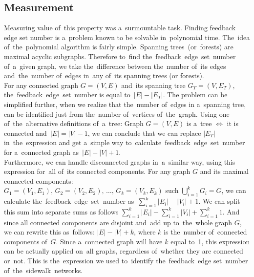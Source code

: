 \subsection{Measurement}
Measuring value of~this property was a~surmountable task. Finding feedback edge set number is a~problem known to be solvable in~polynomial time. The~idea of~the~polynomial algorithm is fairly simple. Spanning trees~(or~forests) are maximal acyclic subgraphs. Therefore to~find the~feedback~edge~set~number of~a~given graph, we take the~difference between the~number of~its edges and~the~number of~edges in~any of~its spanning trees (or forests).~\cite{Beineke} \\
For any connected graph $G = (V, E)$ and~its spanning tree $G_T = (V, E_T)$, the~feedback~edge~set~number is equal to~$|E| - |E_T|$. The problem can be simplified further, when we realize that the~number of~edges in a~spanning tree, can be identified just from the~number of~vertices of~the~graph. Using one of~the~alternative definitions of~a~tree: Graph $G = (V, E)$ is a~tree $\iff$ it is connected and~$|E| = |V| - 1$, we can conclude that we can replace $|E_T|$ in~the~expression and get a~simple way to~calculate~feedback~edge~set~number for a~connected graph as~$|E| - |V| + 1$.\\
Furthermore, we can handle disconnected graphs in~a~similar way, using this expression for~all of~its connected components. For any graph $G$ and its maximal connected components:\\ ${G_1 = (V_1, E_1),\, G_2 = (V_2, E_2),\,\dots,\,G_k = (V_k, E_k)}$ such $\bigcup_{i=1}^{k} G_i = G$, we can calculate the~feedback~edge~set~number as~$\sum_{i=1}^{k} |E_i| - |V_i| + 1$. We can split this sum into separate sums as follows $\sum_{i=1}^{k} |E_i| - \sum_{i=1}^{k} |V_i| + \sum_{i=1}^{k} 1$. And since all connected components are disjoint and~add up to~the~whole graph $G$, we can rewrite this as~follows: $|E| - |V| + k$, where $k$ is the~number of~connected components of~$G$. Since a~connected graph will have $k$ equal to~1, this expression can be actually applied on~all graphs, regardless of~whether they are connected or~not. This is the~expression we used to~identify the~feedback~edge set~number of~the~sidewalk~networks.
